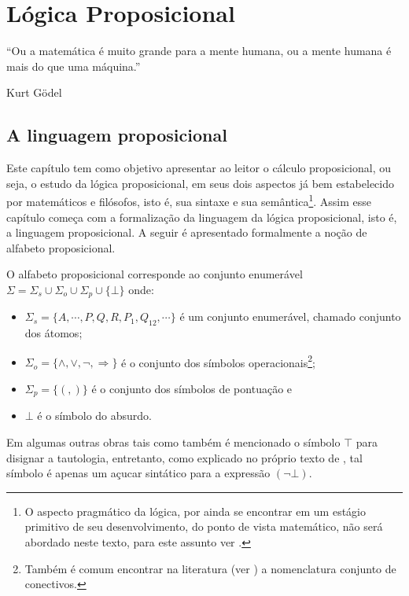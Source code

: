\chapter{Lógica Proposicional}\label{cap:LogicsPropositional}

\epigraph{``Ou a matemática é muito grande para a mente humana, ou a mente humana é mais do que uma máquina.''}{Kurt Gödel}

\section{A linguagem proposicional}\label{A Linguagem proposicional}

Este capítulo tem como objetivo apresentar ao leitor o cálculo proposicional, ou seja, o estudo da lógica proposicional, em seus dois aspectos já bem estabelecido por matemáticos e filósofos, isto é,  sua sintaxe e sua semântica\footnote{O aspecto pragmático da lógica, por ainda se encontrar em um estágio primitivo de seu desenvolvimento, do ponto de vista matemático, não será abordado neste texto, para este assunto ver \cite{rodrigues2021, silva2018}.}. Assim esse capítulo começa com a formalização da linguagem da lógica proposicional, isto é, a linguagem proposicional. A seguir é apresentado formalmente a noção de alfabeto proposicional.

\begin{definicao}\label{def:AlfabetoProposicional}
  O alfabeto proposicional corresponde ao conjunto enumerável $\Sigma = \Sigma_s \cup \Sigma_o \cup \Sigma_p \cup \{\bot\}$ onde:
  \begin{itemize}
      \item $\Sigma_s = \{A, \cdots, P, Q, R, P_1, Q_{12}, \cdots\}$ é um conjunto enumerável, chamado conjunto dos átomos;
      \item $\Sigma_o = \{\land, \lor, \neg, \Rightarrow\}$ é o conjunto dos símbolos operacionais\footnote{Também é comum encontrar na literatura (ver \cite{joaoPavao2014}) a nomenclatura conjunto de conectivos.};
      \item $\Sigma_p = \{(, )\}$ é o conjunto dos símbolos de pontuação e
      \item $\bot$ é o símbolo do absurdo.
  \end{itemize}
\end{definicao}

Em algumas outras obras tais como \cite{carmo2013} também é mencionado o símbolo $\top$ para disignar a tautologia, entretanto, como explicado no próprio texto de \cite{carmo2013}, tal símbolo é apenas um açucar sintático para a expressão $(\neg \bot)$.

